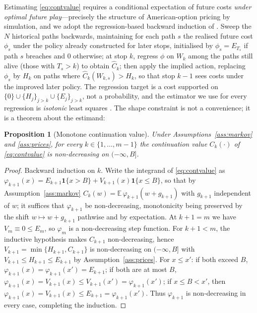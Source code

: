 \documentclass[preprint,authoryear,12pt]{elsarticle}
\newtheorem{proposition}[theorem]{Proposition}
\theoremstyle{definition}
\theoremstyle{remark}
\begin{document}
Estimating \eqref{eq:contvalue} requires a conditional expectation of
future costs \emph{under optimal future play}---precisely the structure
of American-option pricing by simulation, and we adopt the
regression-based backward induction of \citet{longstaff2001valuing}.
Sweep the $N$ historical paths backwards, maintaining for each path $s$
the realised future cost $\phi_s$ under the policy already constructed
for later stops, initialised by $\phi_s = E_{T_s}$ if path $s$ breaches
and $0$ otherwise; at stop $k$, regress $\phi$ on $W_k$ among the paths
still alive (those with $T_s > k$) to obtain $\widehat C_k$; then apply
the implied action, replacing $\phi_s$ by $H_k$ on paths where
$\widehat C_k(W_{k,s}) > H_k$, so that stop $k-1$ sees costs under the
improved later policy. The regression target is a cost supported on
$\{0\} \cup \{H_j\}_{j>k} \cup \{E_j\}_{j>k}$, not a probability, and
the estimator we use for every regression is \emph{isotonic} least
squares \citep{barlow1972statistical}. The shape constraint is not a
convenience; it is a theorem about the estimand:

\begin{proposition}[Monotone continuation value]\label{prop:monotone}
Under Assumptions~\ref{ass:markov} and \ref{ass:prices}, for every
$k \in \{1,\dots,m-1\}$ the continuation value $C_k(\cdot)$ of
\eqref{eq:contvalue} is non-decreasing on $(-\infty, B]$.
\end{proposition}

\begin{proof}
Backward induction on $k$. Write the integrand of \eqref{eq:contvalue}
as $\varphi_{k+1}(x) = E_{k+1}\mathbf 1\{x > B\} +
V_{k+1}(x)\mathbf 1\{x \le B\}$, so that by
Assumption~\ref{ass:markov}
$C_k(w) = \mathbb E\,\varphi_{k+1}(w + g_{k+1})$ with $g_{k+1}$
independent of $w$; it suffices that $\varphi_{k+1}$ be non-decreasing,
monotonicity being preserved by the shift $w \mapsto w + g_{k+1}$
pathwise and by expectation. At $k+1 = m$ we have
$V_m \equiv 0 \le E_m$, so $\varphi_m$ is a non-decreasing step
function. For $k+1 < m$, the inductive hypothesis makes $C_{k+1}$
non-decreasing, hence $V_{k+1} = \min\{H_{k+1}, C_{k+1}\}$ is
non-decreasing on $(-\infty,B]$ with $V_{k+1} \le H_{k+1} \le E_{k+1}$
by Assumption~\ref{ass:prices}. For $x \le x'$: if both exceed $B$,
$\varphi_{k+1}(x) = \varphi_{k+1}(x') = E_{k+1}$; if both are at most
$B$, $\varphi_{k+1}(x) = V_{k+1}(x) \le V_{k+1}(x') =
\varphi_{k+1}(x')$; if $x \le B < x'$, then
$\varphi_{k+1}(x) = V_{k+1}(x) \le E_{k+1} = \varphi_{k+1}(x')$. Thus
$\varphi_{k+1}$ is non-decreasing in every case, completing the
induction.
\end{proof}
\end{document}
